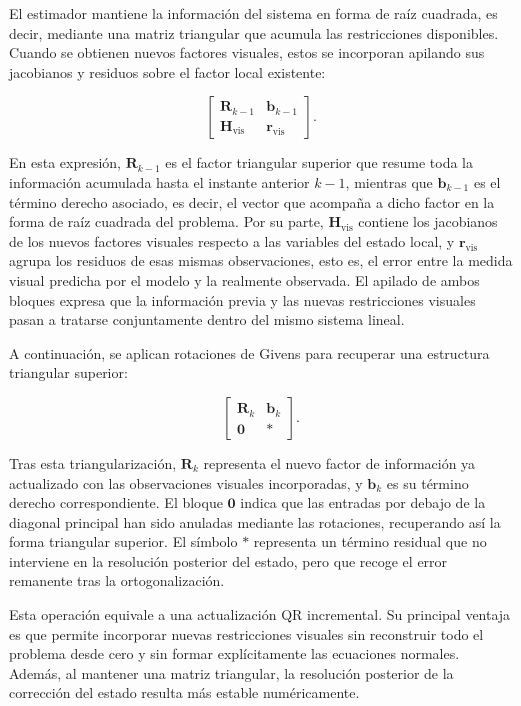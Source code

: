 El estimador mantiene la información del sistema en forma de raíz cuadrada, es decir, mediante
una matriz triangular que acumula las restricciones disponibles. Cuando se obtienen nuevos
factores visuales, estos se incorporan apilando sus jacobianos y residuos sobre el factor
local existente:

\[
\begin{bmatrix}
\mathbf{R}_{k-1} & \mathbf{b}_{k-1} \\
\mathbf{H}_{\mathrm{vis}} & \mathbf{r}_{\mathrm{vis}}
\end{bmatrix}.
\]

En esta expresión, \(\mathbf{R}_{k-1}\) es el factor triangular superior que resume toda la
información acumulada hasta el instante anterior \(k-1\), mientras que \(\mathbf{b}_{k-1}\)
es el término derecho asociado, es decir, el vector que acompaña a dicho factor en la forma
de raíz cuadrada del problema. Por su parte, \(\mathbf{H}_{\mathrm{vis}}\) contiene los
jacobianos de los nuevos factores visuales respecto a las variables del estado local, y
\(\mathbf{r}_{\mathrm{vis}}\) agrupa los residuos de esas mismas observaciones, esto es, el
error entre la medida visual predicha por el modelo y la realmente observada. El apilado de
ambos bloques expresa que la información previa y las nuevas restricciones visuales pasan a
tratarse conjuntamente dentro del mismo sistema lineal.

A continuación, se aplican rotaciones de Givens para recuperar una estructura triangular
superior:

\[
\begin{bmatrix}
\mathbf{R}_{k} & \mathbf{b}_{k} \\
\mathbf{0} & *
\end{bmatrix}.
\]

Tras esta triangularización, \(\mathbf{R}_{k}\) representa el nuevo factor de información ya
actualizado con las observaciones visuales incorporadas, y \(\mathbf{b}_{k}\) es su término
derecho correspondiente. El bloque \(\mathbf{0}\) indica que las entradas por debajo de la
diagonal principal han sido anuladas mediante las rotaciones, recuperando así la forma
triangular superior. El símbolo \(*\) representa un término residual que no interviene en la
resolución posterior del estado, pero que recoge el error remanente tras la ortogonalización.

Esta operación equivale a una actualización QR incremental. Su principal ventaja es que
permite incorporar nuevas restricciones visuales sin reconstruir todo el problema desde
cero y sin formar explícitamente las ecuaciones normales. Además, al mantener una matriz
triangular, la resolución posterior de la corrección del estado resulta más estable
numéricamente.

